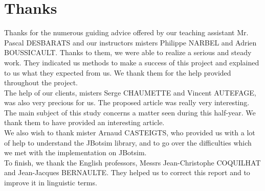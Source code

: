 \chapter*{Thanks}

Thanks for the numerous guiding advice offered by our teaching assistant Mr. Pascal DESBARATS and our instructors misters Philippe NARBEL and Adrien BOUSSICAULT. Thanks to them, we were able to realize a serious and steady work. They indicated us methods to make a success of this project and explained to us what they expected from us. We thank them for the help provided throughout the project.\\

The help of our clients, misters Serge CHAUMETTE and Vincent AUTEFAGE, was also very precious for us. The proposed article was really very interesting. The main subject of this study concerns a matter seen during this half-year. We thank them to have provided an interesting article.\\

We also wish to thank mister Arnaud CASTEIGTS, who provided us with a lot of help to understand the JBotsim library, and to go over the difficulties which we met with the implementation on JBotsim.\\

To finish, we thank the English professors, Messrs Jean-Christophe COQUILHAT and Jean-Jacques BERNAULTE. They helped us to correct this report and to improve it in linguistic terms.